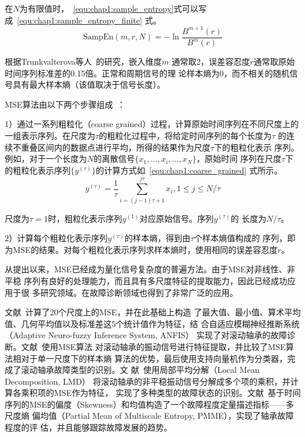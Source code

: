 在$N$为有限值时，~\ref{equ:chap1:sample_entropy}式可以写成~\ref{equ:chap1:sample_entropy_finite}
式。
\begin{equation}
  \label{equ:chap1:sample_entropy_finite}
  \text{SampEn}(m, r, N) = -\ln\frac{B^{m+1}(r)}{B^m(r)}
\end{equation}

根据Trunkvalterova等人~\cite{trunkvalterova2008reduced}的研究，嵌入维度$m$
通常取2，误差容忍度$r$通常取原始时间序列标准差的0.15倍。正常和周期信号的理
论样本熵为0，而不相关的随机信号具有最大样本熵（该值取决于信号长度）。

MSE算法由以下两个步骤组成~\cite{costa2002multiscale, costa2005multiscale}：

1）通过一系列粗粒化（coarse grained）过程，计算原始时间序列在不同尺度上的
一组表示序列。在尺度为$\tau$的粗粒化过程中，将给定时间序列的每个长度为$\tau$
的连续不重叠区间内的数据点进行平均，所得的结果作为尺度$\tau$下的粗粒化表示
序列。例如，对于一个长度为$N$的离散信号$\{x_1,...,x_i,...,x_N\}$，原始时间
序列在尺度$\tau$下的粗粒化表示序列$\{y^{(\tau)}\}$的计算方式如~\ref{equ:chap1:coarse_grained}
式所示。
\begin{equation}
  \label{equ:chap1:coarse_grained}
  y^{(\tau)} = \frac{1}{\tau}\sum_{i=(j-1)\tau + 1}^{j\tau}x_i , 1\leq j\leq N/\tau
\end{equation}

尺度为$\tau=1$时，粗粒化表示序列$y^{(1)}$对应原始信号。序列$y^{(\tau)}$的
长度为$N/\tau$。

2）计算每个粗粒化表示序列$y^{(\tau)}$的样本熵，得到由$\tau$个样本熵值构成的
序列，即为MSE的结果。对每个粗粒化表示序列求样本熵时，使用相同的误差容忍度$r$。

从提出以来，MSE已经成为量化信号复杂度的普遍方法。由于MSE对非线性、非平稳
序列有良好的处理能力，而且具有多尺度特征的提取能力，因此已经成功应用于很
多研究领域。在故障诊断领域也得到了非常广泛的应用。

文献~计算了20个尺度上的MSE，并在此基础上构造
了最大值、最小值、算术平均值、几何平均值以及标准差这5个统计值作为特征，结
合自适应模糊神经推断系统（Adaptive Neuro-fuzzy Inference System, ANFIS）
实现了对滚动轴承的故障诊断。文献~使用MSE算法
对滚动轴承的振动信号进行特征提取，并比较了MSE算法相对于单一尺度下的样本熵
算法的优势，最后使用支持向量机作为分类器，完成了滚动轴承故障类型的识别。文
献~使用局部平均分解（Local Mean Decomposition, LMD）
将滚动轴承的非平稳振动信号分解成多个项的乘积，并计算各乘积项的MSE作为特征，
实现了多种类型的故障状态的识别。文献~基于时间
序列的MSE的偏度（Skewness）和均值构造了一个故障程度定量描述指标——多尺度熵
偏均值（Partial Mean of Multiscale Entropy, PMME），实现了轴承故障程度的评
估，并且能够跟踪故障发展的趋势。

